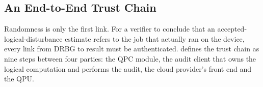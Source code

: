 \subsection{An End-to-End Trust Chain}\label{sec:pqc:trustchain}

Randomness is only the first link. For a verifier to conclude that an accepted-logical-disturbance estimate refers to the job that actually ran on the device, every link from DRBG to result must be authenticated.  defines the trust chain as nine steps between four parties: the QPC module, the audit client that owns the logical computation and performs the audit, the cloud provider's front end and the QPU.

